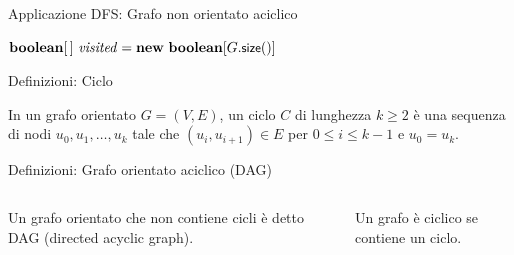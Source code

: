 \begin{frame}[shrink=10]{Applicazione DFS: Grafo non orientato aciclico}

\large
\begin{Procedure}
\caption[A]{$\BOOLEAN\ \fontproc{hasCycle}(\Graph\ G)$}
$\BOOLEAN[\,]\ \mmark = \NEW\ \BOOLEAN[G.\fontproc{size}()]$\;
\Return \FALSE\;
\end{Procedure}

\end{frame}


\begin{frame}{Definizioni: Ciclo}
	
\vspace{-9pt}
\begin{myboxtitle}
In un grafo orientato $G=(V,E)$, un \alert{ciclo} $C$ di lunghezza $k \geq 2$ è una sequenza di nodi $u_0, u_1, \ldots, u_k$ tale che $(u_i, u_{i+1}) \in E$ per $0 \leq i \leq k-1$ e $u_0 = u_k$.
\end{myboxtitle}


\end{frame}

\begin{frame}{Definizioni: Grafo orientato aciclico (DAG)}

\vspace{-9pt}
\begin{columns}[T]
\begin{myboxtitle}[DAG]
Un grafo orientato che non contiene cicli è detto \alert{DAG} (\alert{directed acyclic graph}).
\end{myboxtitle}

\bigskip
\begin{myboxtitle}
Un grafo è \alert{ciclico} se contiene un ciclo.
\end{myboxtitle}
    
\vspace{-12pt}

\end{columns}
\end{frame}

